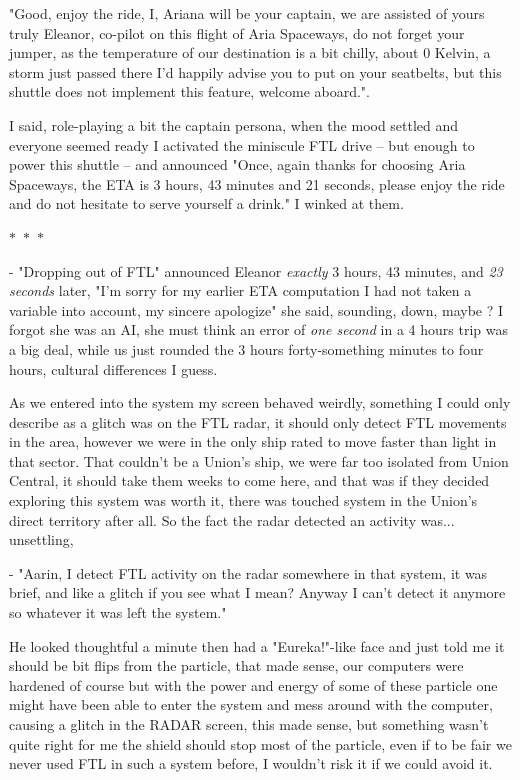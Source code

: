\documentclass[colorlinks,12pt,a4paper]{book}
\newcommand\sep{\begin{center}
  \boldmath $\ast$~$\ast$~$\ast$
\end{center}}
\begin{document}
 "Good, enjoy the ride, I, Ariana will be your captain, we are assisted of yours truly Eleanor, co-pilot on this flight of Aria Spaceways, do not forget your jumper, as the temperature of our destination is a 
 bit chilly, about 0 Kelvin, a storm just passed there I'd happily advise you to put on your seatbelts, but this shuttle does not implement this 
 feature, welcome aboard.". 
 
 I said, role-playing a bit the captain persona, when the mood settled and everyone seemed ready I activated 
 the miniscule FTL drive -- but enough to power this shuttle -- and announced "Once, again thanks for choosing Aria Spaceways, the ETA is 
 3 hours, 43 minutes and 21 seconds, please enjoy the ride and do not hesitate to serve yourself a drink." I winked at them.
 
 \sep 
 
 - "Dropping out of FTL" announced Eleanor \textit{exactly} 3 hours, 43 minutes, and \textit{23 seconds} later, "I'm sorry for my 
 earlier ETA computation I had not taken a variable into account, my sincere apologize" she said, sounding, down, maybe ?
 I forgot she was an AI, she must think an error of \textit{one second} in a 4 hours trip was a big deal, while us just rounded
 the 3 hours forty-something minutes to four hours, cultural differences I guess.\par 
 \bigskip
 
 As we entered into the system my screen behaved weirdly, something I could only describe as a glitch was on the FTL radar, 
 it should only detect FTL movements in the area, however we were in the only ship rated to move faster than light in that sector. That 
 couldn't be a Union's ship, we were far too isolated from Union Central, it should take them weeks to come here, and that was 
 if they decided exploring this system was worth it, there was touched system in the Union's direct territory after all. So the 
 fact the radar detected an activity was... unsettling,\par
 \bigskip
 
 - "Aarin, I detect FTL activity on the radar somewhere in that system, it was brief, and like a glitch if you see what I mean?
 Anyway I can't detect it anymore so whatever it was left the system."\par 
 \bigskip 
 
 He looked thoughtful a minute then had a "Eureka!"-like face and just told me it should be bit flips from the particle,
 that made sense, our computers were hardened of course but with the power and energy of some of these particle one might have 
 been able to enter the system and mess around with the computer, causing a glitch in the RADAR screen, this made sense, but 
 something wasn't quite right for me the shield should stop most of the particle, even if to be fair we never used FTL in such a 
 system before, I wouldn't risk it if we could avoid it.\par 
 \bigskip
 
\end{document}

